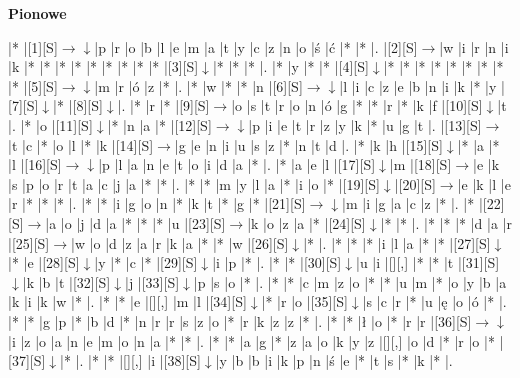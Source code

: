 \documentclass[11pt]{article}
\newcommand\drarr{$\rightarrow \!\!\!\!\! \downarrow$}
\newcommand\rarr{$\rightarrow$}
\newcommand\darr{$\downarrow$}
\begin{document}
\begin{PuzzleClues}{\textbf{Pionowe}\\}
\end{PuzzleClues}\newpage%

\noindent\begin{Puzzle}{19}{30}|*	|[1][S]\drarr	|p	|r	|o	|b	|l	|e	|m	|a	|t	|y	|c	|z	|n	|o	|ś	|ć	|*	|*	|.
|[2][S]\rarr	|w	|i	|r	|n	|i	|k	|*	|*	|*	|*	|*	|*	|*	|*	|*	|[3][S]\darr	|*	|*	|*	|.
|*	|y	|*	|*	|[4][S]\darr	|*	|*	|*	|*	|*	|*	|*	|*	|*	|[5][S]\drarr	|m	|r	|ó	|z	|*	|.
|*	|w	|*	|*	|n	|[6][S]\drarr	|l	|i	|c	|z	|e	|b	|n	|i	|k	|*	|y	|[7][S]\darr	|*	|[8][S]\darr	|.
|*	|r	|*	|[9][S]\rarr	|o	|s	|t	|r	|o	|n	|ó	|g	|*	|*	|r	|*	|k	|f	|[10][S]\darr	|t	|.
|*	|o	|[11][S]\darr	|*	|n	|a	|*	|[12][S]\drarr	|p	|i	|e	|t	|r	|z	|y	|k	|*	|u	|g	|t	|.
|[13][S]\rarr	|t	|c	|*	|o	|l	|*	|k	|[14][S]\rarr	|g	|e	|n	|i	|u	|s	|z	|*	|n	|t	|d	|.
|*	|k	|h	|[15][S]\darr	|*	|a	|*	|l	|[16][S]\drarr	|p	|l	|a	|n	|e	|t	|o	|i	|d	|a	|*	|.
|*	|a	|e	|l	|[17][S]\darr	|m	|[18][S]\rarr	|e	|k	|s	|p	|o	|r	|t	|a	|c	|j	|a	|*	|*	|.
|*	|*	|m	|y	|l	|a	|*	|i	|o	|*	|[19][S]\darr	|[20][S]\rarr	|e	|k	|l	|e	|r	|*	|*	|*	|.
|*	|*	|i	|g	|o	|n	|*	|k	|t	|*	|g	|*	|[21][S]\drarr	|m	|i	|g	|a	|c	|z	|*	|.
|*	|[22][S]\rarr	|a	|o	|j	|d	|a	|*	|*	|*	|u	|[23][S]\rarr	|k	|o	|z	|a	|*	|[24][S]\darr	|*	|*	|.
|*	|*	|*	|d	|a	|r	|[25][S]\rarr	|w	|o	|d	|z	|a	|r	|k	|a	|*	|*	|w	|[26][S]\darr	|*	|.
|*	|*	|*	|i	|l	|a	|*	|*	|[27][S]\darr	|*	|e	|[28][S]\darr	|y	|*	|c	|*	|[29][S]\darr	|i	|p	|*	|.
|*	|*	|[30][S]\darr	|u	|i	|[][,]{ }	|*	|*	|t	|[31][S]\darr	|k	|b	|t	|[32][S]\darr	|j	|[33][S]\darr	|p	|s	|o	|*	|.
|*	|*	|c	|m	|z	|o	|*	|*	|u	|m	|*	|o	|y	|b	|a	|k	|i	|k	|w	|*	|.
|*	|*	|e	|[][,]{ }	|m	|l	|[34][S]\darr	|*	|r	|o	|[35][S]\darr	|s	|c	|r	|*	|u	|ę	|o	|ó	|*	|.
|*	|*	|g	|p	|*	|b	|d	|*	|n	|r	|r	|s	|z	|o	|*	|r	|k	|z	|z	|*	|.
|*	|*	|ł	|o	|*	|r	|r	|[36][S]\drarr	|i	|z	|o	|a	|n	|e	|m	|o	|n	|a	|*	|*	|.
|*	|*	|a	|g	|*	|z	|a	|o	|k	|y	|z	|[][,]{ }	|o	|d	|*	|r	|o	|*	|[37][S]\darr	|*	|.
|*	|*	|[][,]{ }	|i	|[38][S]\darr	|y	|b	|b	|i	|k	|p	|n	|ś	|e	|*	|t	|s	|*	|k	|*	|.

\end{Puzzle}
\end{document}
